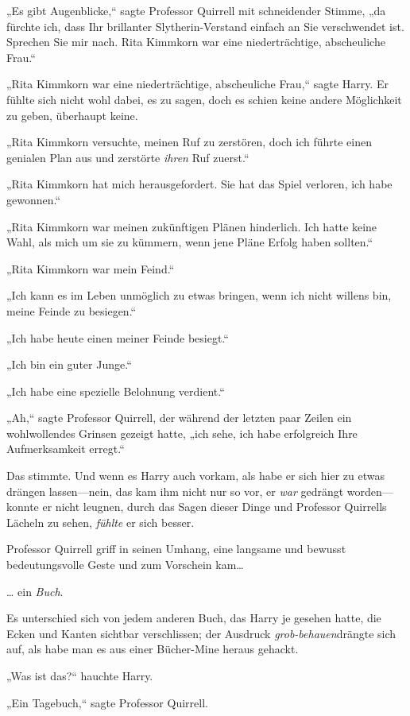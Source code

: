{„Es gibt Augenblicke,“ sagte Professor Quirrell mit schneidender Stimme, „da fürchte ich, dass Ihr brillanter Slytherin-Verstand einfach an Sie verschwendet ist. Sprechen Sie mir nach. Rita Kimmkorn war eine niederträchtige, abscheuliche Frau.“

„Rita Kimmkorn war eine niederträchtige, abscheuliche Frau,“ sagte Harry. Er fühlte sich nicht wohl dabei, es zu sagen, doch es schien keine andere Möglichkeit zu geben, überhaupt keine.

„Rita Kimmkorn versuchte, meinen Ruf zu zerstören, doch ich führte einen genialen Plan aus und zerstörte \emph{ihren} Ruf zuerst.“

„Rita Kimmkorn hat mich herausgefordert. Sie hat das Spiel verloren, ich habe gewonnen.“

„Rita Kimmkorn war meinen zukünftigen Plänen hinderlich. Ich hatte keine Wahl, als mich um sie zu kümmern, wenn jene Pläne Erfolg haben sollten.“

„Rita Kimmkorn war mein Feind.“

„Ich kann es im Leben unmöglich zu etwas bringen, wenn ich nicht willens bin, meine Feinde zu besiegen.“

„Ich habe heute einen meiner Feinde besiegt.“

„Ich bin ein guter Junge.“

„Ich habe eine spezielle Belohnung verdient.“

„Ah,“ sagte Professor Quirrell, der während der letzten paar Zeilen ein wohlwollendes Grinsen gezeigt hatte, „ich sehe, ich habe erfolgreich Ihre Aufmerksamkeit erregt.“

Das stimmte. Und wenn es Harry auch vorkam, als habe er sich hier zu etwas drängen lassen—nein, das kam ihm nicht nur so vor, er \emph{war} gedrängt worden—konnte er nicht leugnen, durch das Sagen dieser Dinge und Professor Quirrells Lächeln zu sehen, \emph{fühlte} er sich besser.

Professor Quirrell griff in seinen Umhang, eine langsame und bewusst bedeutungsvolle Geste und zum Vorschein kam…

… ein \emph{Buch}.

Es unterschied sich von jedem anderen Buch, das Harry je gesehen hatte, die Ecken und Kanten sichtbar verschlissen; der Ausdruck \emph{grob-behauen}drängte sich auf, als habe man es aus einer Bücher-Mine heraus gehackt.

„Was ist das?“ hauchte Harry.

„Ein Tagebuch,“ sagte Professor Quirrell.

}
